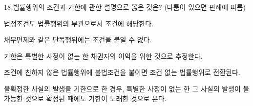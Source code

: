 \begin{question}{18}
법률행위의 조건과 기한에 관한 설명으로 옳은 것은? (다툼이 있으면 판례에 따름)
\begin{choices}
  \item 법정조건도 법률행위의 부관으로서 조건에 해당한다.
  \item 채무면제와 같은 단독행위에는 조건을 붙일 수 없다.
  \item 기한은 특별한 사정이 없는 한 채권자의 이익을 위한 것으로 추정한다.
  \item 조건에 친하지 않은 법률행위에 불법조건을 붙이면 조건 없는 법률행위로 전환된다.
  \item 불확정한 사실의 발생을 기한으로 한 경우, 특별한 사정이 없는 한 그 사실의 발생이 불가능한 것으로 확정된 때에도 기한이 도래한 것으로 본다.
\end{choices}
\end{question}

